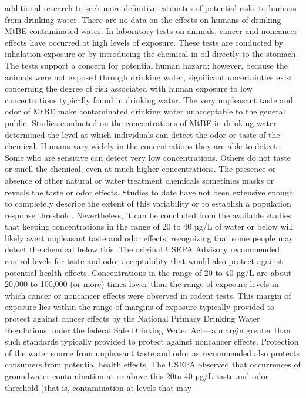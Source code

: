 \documentclass{article}
\begin{document}
additional research to seek more definitive estimates of potential risks
to humans from drinking water. There are no data on the effects on
humans of drinking MtBE-contaminated water. In laboratory tests on
animals, cancer and noncancer effects have occurred at high levels of
exposure. These tests are conducted by inhalation exposure or by
introducing the chemical in oil directly to the stomach. The tests
support a concern for potential human hazard; however, because the
animals were not exposed through drinking water, significant
uncertainties exist concerning the degree of risk associated with human
exposure to low concentrations typically found in drinking water. The
very unpleasant taste and odor of MtBE make contaminated drinking water
unacceptable to the general public. Studies conducted on the
concentrations of MtBE in drinking water determined the level at which
individuals can detect the odor or taste of the chemical. Humans vary
widely in the concentrations they are able to detect. Some who are
sensitive can detect very low concentrations. Others do not taste or
smell the chemical, even at much higher concentrations. The presence or
absence of other natural or water treatment chemicals sometimes masks or
reveals the taste or odor effects. Studies to date have not been
extensive enough to completely describe the extent of this variability
or to establish a population response threshold. Nevertheless, it can be
concluded from the available studies that keeping concentrations in the
range of 20 to 40 µg/L of water or below will likely avert unpleasant
taste and odor effects, recognizing that some people may detect the
chemical below this. The original USEPA Advisory recommended control
levels for taste and odor acceptability that would also protect against
potential health effects. Concentrations in the range of 20 to 40 µg/L
are about 20,000 to 100,000 (or more) times lower than the range of
exposure levels in which cancer or noncancer effects were observed in
rodent tests. This margin of exposure lies within the range of margins
of exposure typically provided to protect against cancer effects by the
National Primary Drinking Water Regulations under the federal Safe
Drinking Water Act---a margin greater than such standards typically
provided to protect against noncancer effects. Protection of the water
source from unpleasant taste and odor as recommended also protects
consumers from potential health effects. The USEPA observed that
occurrences of groundwater contamination at or above this 20to 40-µg/L
taste and odor threshold (that is, contamination at levels that may
\end{document}
